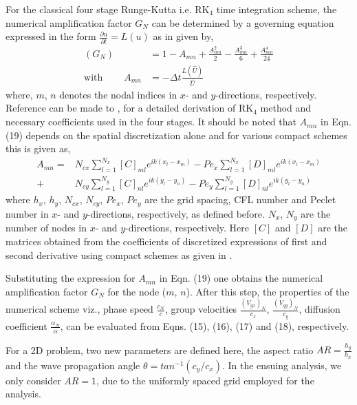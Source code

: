 \documentclass[showpacs,preprintnumbers,amsmath,amssymb]{revtex4-1} %
\begin{document}
For the classical four stage Runge-Kutta i.e. RK$_4$ time integration scheme, the numerical amplification factor $G_N$ can be determined by a governing equation expressed in the form $\frac{\partial u}{\partial t}=L(u)$ as in \cite{sengupta2013high} given by,
\begin{equation}
\begin{aligned}
(G_N)&=1-A_{mn}+\frac{A_{mn}^2}{2}-\frac{A_{mn}^3}{6}+\frac{A_{mn}^4}{24}\\ 
\text{with}\ \ \ \ \ \ \ \ \ \ A_{mn}&=-\Delta t\frac{L(\hat{U})}{\hat{U}}
\end{aligned}
\end{equation}
where, $m$, $n$ denotes the nodal indices in $x$- and $y$-directions, respectively. Reference can be made to \cite{sengupta2013high}, for a detailed derivation of RK$_4$ method and necessary coefficients used in the four stages. It should be noted that $A_{mn}$ in Eqn. (19) depends on the spatial discretization alone and for various compact schemes this is given as,
\begin{equation}
\begin{aligned}
A_{mn}=&N_{cx}\sum_{l=1}^{N_x} {[C]}_{ml}e^{ik(x_l-x_m)}-Pe_x\sum_{l=1}^{N_x} {[D]}_{ml}e^{ik(x_l-x_m)} \\
+&N_{cy}\sum_{l=1}^{N_y} {[C]}_{nl}e^{ik(y_l-y_n)}-Pe_y\sum_{l=1}^{N_y} {[D]}_{nl}e^{ik(y_l-y_n)}
\end{aligned}
\end{equation}
where $h_x$, $h_y$, $N_{cx}$, $N_{cy}$, $Pe_{x}$, $Pe_{y}$ are the grid spacing, CFL number and Peclet number in $x$- and $y$-directions, respectively, as defined before. $N_{x}$, $N_{y}$ are the number of nodes in $x$- and $y$-directions, respectively. Here $[C]$ and $[D]$ are the matrices obtained from the coefficients of discretized expressions of first and second derivative using compact schemes as given in \cite{sengupta2013high, SUMAN_et_al}.

Substituting the expression for $A_{mn}$ in Eqn. (19) one obtains the numerical amplification factor $G_N$ for the node ($m$, $n$). After this step, the properties of the numerical scheme viz., phase speed $\frac{c_N}{c}$, group velocities $\frac{(V_{gx})_N}{c_x}$, $\frac{(V_{gy})_N}{c_y}$, diffusion coefficient $\frac{\alpha_N}{\alpha}$, can be evaluated from Eqns. (15), (16), (17) and (18), respectively.

For a 2D problem, two new parameters are defined here, the aspect ratio $AR=\frac{h_y}{h_x}$ and the wave propagation angle $\theta=tan^{-1}(c_y/c_x)$. In the ensuing analysis, we only consider $AR=1$, due to the uniformly spaced grid employed for the analysis.
\end{document}
